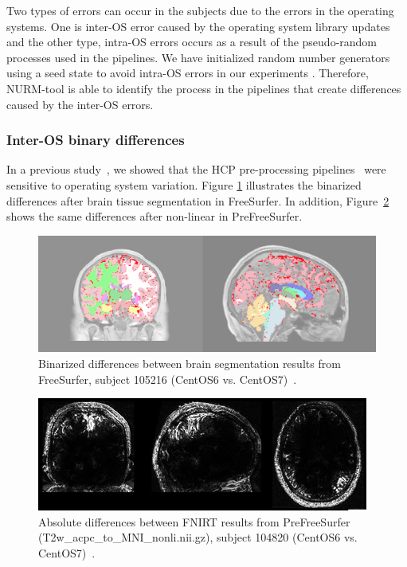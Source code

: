 \documentclass[a4paper,num-refs]{oup-contemporary}
\begin{document}
Two types of errors can occur in the subjects due to the 
errors in the operating systems. One is inter-OS error caused by the 
operating system library updates and the other type, intra-OS errors 
occurs as a result of the pseudo-random processes used in the 
pipelines. 
We have initialized random number generators using a seed state 
to avoid intra-OS errors in our experiments . 
Therefore, NURM-tool is able to identify the process in the pipelines 
that create differences caused by the inter-OS errors. 

\subsubsection{Inter-OS binary differences}

In a previous study~\cite{Scaria2017}, we showed that the HCP pre-processing 
pipelines~\cite{glasser2013} were 
sensitive to operating system variation. Figure 
\ref{fig:tissue_class} illustrates the binarized differences after brain 
tissue segmentation in FreeSurfer. In addition, 
Figure~\ref{fig:fnirt_result} shows the same differences after 
non-linear in PreFreeSurfer. 

\begin{figure}
\centering
  \includegraphics[width=\columnwidth]{images/brain_classification.png} 
  \caption{Binarized differences between brain segmentation results from 
           FreeSurfer, subject 105216 (CentOS6 vs. CentOS7)~\cite{Scaria2017}.} 
  \label{fig:tissue_class}
\end{figure}

\begin{figure}
\centering
  \includegraphics[width=\columnwidth]{images/fnirt_result.png} 
  \caption{Absolute differences between FNIRT results from PreFreeSurfer 
  (T2w\_acpc\_to\_MNI\_nonli.nii.gz), subject 104820 (CentOS6 vs. 
  CentOS7)~\cite{Scaria2017}. } 
  \label{fig:fnirt_result}
\end{figure}
\end{document}
